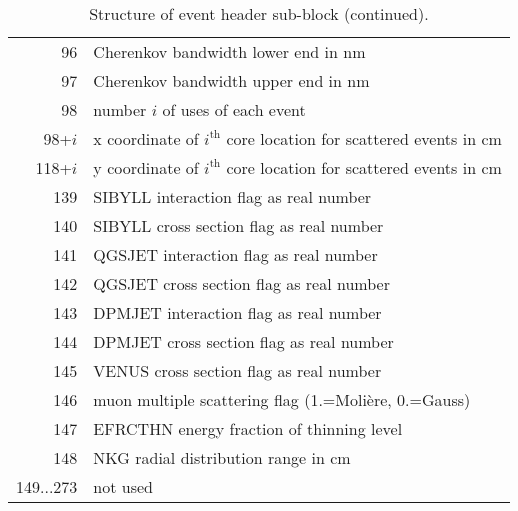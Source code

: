 {\begin{table}[t]
\begin{center}
\begin{tabular}{|r|l|}
96 &Cherenkov bandwidth lower end in nm \\
97 &Cherenkov bandwidth upper end in nm \\
98 &number $i$ of uses of each event \\
98+$i$& x coordinate of $i^{\mathrm{th}}$ core location for scattered events in cm \\
118+$i$& y coordinate of $i^{\mathrm{th}}$ core location for scattered events in cm\\
139 &SIBYLL interaction flag as real number \\
140 &SIBYLL cross section flag as real number \\
141 &QGSJET interaction flag as real number \\
142 &QGSJET cross section flag as real number \\
143 &DPMJET interaction flag as real number \\
144 &DPMJET cross section flag as real number \\
145 &VENUS cross section flag as real number \\
146 &muon multiple scattering flag (1.=Moli{\`e}re, 0.=Gauss) \\
147 &EFRCTHN energy fraction of thinning level \\
148 &NKG radial distribution range in cm \\
149...273 &not used\\
\hline
    \end{tabular}
  \end{center}
  \caption{Structure of event header sub-block (continued).}
  \label{tab:eh2}
\end{table}
}

